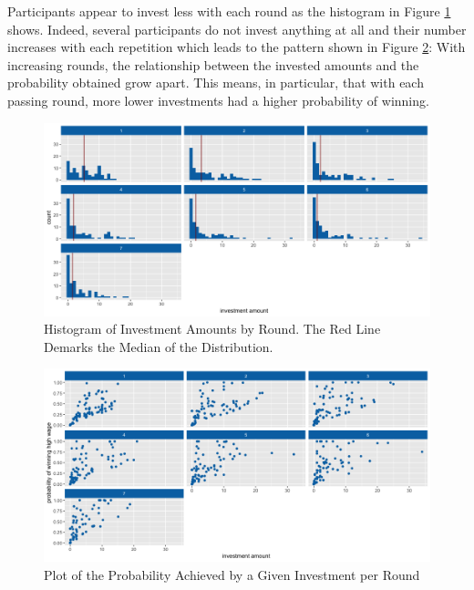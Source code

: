Participants appear to invest less with each round as the histogram in Figure \ref{fig:invest_hist} shows. Indeed, several participants do not invest anything at all and their number increases with each repetition which leads to the pattern shown in Figure \ref{fig:invest_prob_point}: With increasing rounds, the relationship between the invested amounts and the probability obtained grow apart. This means, in particular, that with each passing round, more lower investments had a higher probability of winning.\\

\begin{figure}[H]
    \centering
    \includegraphics[scale=0.4]{graphs/investment_amount_hist.png}
    \caption{Histogram of Investment Amounts by Round. The Red Line Demarks the Median of the Distribution.}
    \label{fig:invest_hist}
\end{figure}

\begin{figure}[H]
    \centering
    \includegraphics[scale=0.4]{graphs/invest_prob_point.png}
    \caption{Plot of the Probability Achieved by a Given Investment per Round}
    \label{fig:invest_prob_point}
\end{figure}

